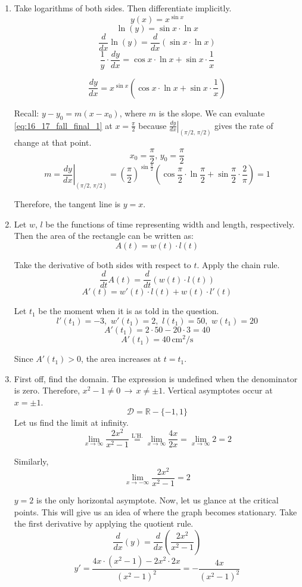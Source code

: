 \documentclass[a4paper, 12pt]{article}
\begin{document}
\begin{enumerate}[leftmargin=*,label=\textbf{\arabic*.}]
\item Take logarithms of both sides. Then differentiate implicitly.
\[y(x) = x^{\sin x}\]
\[\ln(y) = \sin x \cdot \ln x\]
\[\frac{d}{dx}\ln(y) = \frac{d}{dx}(\sin x \cdot \ln x)\]
\[\frac{1}{y} \cdot \frac{dy}{dx} =  \cos x \cdot \ln x +  \sin x \cdot \frac{1}{x}\]

\begin{equation} \frac{dy}{dx} = x^{\sin x}\left(\cos x \cdot \ln x +  \sin x \cdot \frac{1}{x}\right)\label{eq:16_17_fall_final_1}\end{equation}

Recall: $y-y_0 = m(x-x_0)$, where $m$ is the slope. We can evaluate \eqref{eq:16_17_fall_final_1} at $x = \frac{\pi}{2}$ because $\left.\frac{dy}{dx}\right|_{(\pi/2,\, \pi/2)}$ gives the rate of change at that point.
\[x_0=\frac{\pi}{2},\,y_0 = \frac{\pi}{2}\]
\[m=\left.\frac{dy}{dx}\right|_{(\pi/2,\, \pi/2)} = \left(\frac{\pi}{2}\right)^{\sin \frac{\pi}{2}}\left(\cos\frac{\pi}{2} \cdot \ln \frac{\pi}{2} + \sin \frac{\pi}{2} \cdot \frac{2}{\pi}\right) = 1\]

Therefore, the tangent line is $\boxed{y=x}$.

\item Let $w$, $l$ be the functions of time representing width and length, respectively. Then the area of the rectangle can be written as:
\[A(t) = w(t)\cdot l(t)\]

Take the derivative of both sides with respect to $t$. Apply the chain rule.
\[\frac{d}{dt}A(t) = \frac{d}{dt}(w(t)\cdot l(t))\]
\[A'(t) = w'(t)\cdot l(t) + w(t)\cdot l'(t)\]

Let $t_1$ be the moment when it is as told in the question.
\[l'(t_1) = -3,\,\,w'(t_1) = 2,\,\,l(t_1) = 50,\,\, w(t_1) = 20\]
\[A'(t_1) = 2\cdot 50 - 20\cdot 3 = 40\]
\[\boxed{A'(t_1) = 40\, \text{cm}^2/\text{s}}\]

Since $A'(t_1) > 0$, the area increases at $t=t_1$.

\item First off, find the domain. The expression is undefined when the denominator is zero. Therefore, $x^2-1 \neq 0 \,\rightarrow\, x\neq \pm 1$. Vertical asymptotes occur at $x = \pm 1$.
\[\mathcal{D} = \mathbb{R} - \{-1, 1\} \]
Let us find the limit at infinity.
\[\lim_{x\to \infty} \frac{2x^2}{x^2-1} \overset{\text{L'H.}}{=} \lim_{x\to \infty} \frac{4x}{2x} = \lim_{x\to \infty} 2 = 2\]

Similarly,
\[\lim_{x\to -\infty} \frac{2x^2}{x^2-1} = 2\]

$y=2$ is the only horizontal asymptote. Now, let us glance at the critical points. This will give us an idea of where the graph becomes stationary. Take the first derivative by applying the quotient rule.
\[\frac{d}{dx}(y)=\frac{d}{dx}\left(\frac{2x^2}{x^2-1}\right)\]
\[y'=\frac{4x\cdot(x^2-1)-2x^2\cdot 2x}{\left(x^2-1\right)^2}=-\frac{4x}{\left(x^2-1\right)^2} \]


\end{enumerate}
\end{document}
